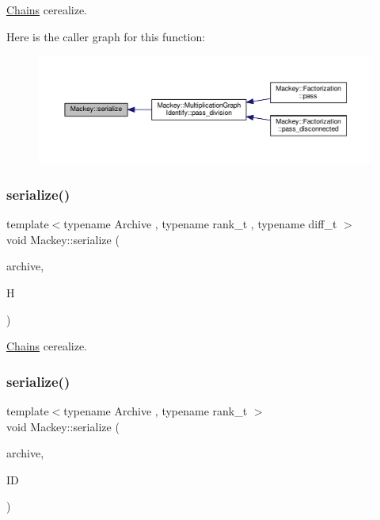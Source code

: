 \hyperlink{classMackey_1_1Chains}{Chains} cerealize. 

Here is the caller graph for this function\+:\nopagebreak
\begin{figure}[H]
\begin{center}
\leavevmode
\includegraphics[width=350pt]{namespaceMackey_a43cf712cb611ddbafa91b005a911436e_icgraph}
\end{center}
\end{figure}
\mbox{\label{namespaceMackey_a1cb51476ba1b1022264da5ba324b73f5}} 
\subsubsection{\texorpdfstring{serialize()}{serialize()}\hspace{0.1cm}{\footnotesize\ttfamily [2/6]}}
{\footnotesize\ttfamily template$<$typename Archive , typename rank\+\_\+t , typename diff\+\_\+t $>$ \\
void Mackey\+::serialize (\begin{DoxyParamCaption}\item[{Archive \&}]{archive,  }\item[{\hyperlink{classMackey_1_1Homology}{Homology}$<$ rank\+\_\+t, diff\+\_\+t $>$ \&}]{H }\end{DoxyParamCaption})}



\hyperlink{classMackey_1_1Chains}{Chains} cerealize. 

\mbox{\label{namespaceMackey_ac78e550c9949977ed71367fb21892e93}} 
\subsubsection{\texorpdfstring{serialize()}{serialize()}\hspace{0.1cm}{\footnotesize\ttfamily [3/6]}}
{\footnotesize\ttfamily template$<$typename Archive , typename rank\+\_\+t $>$ \\
void Mackey\+::serialize (\begin{DoxyParamCaption}\item[{Archive \&}]{archive,  }\item[{\hyperlink{classMackey_1_1IDGenerators}{I\+D\+Generators}$<$ rank\+\_\+t $>$ \&}]{ID }\end{DoxyParamCaption})}



